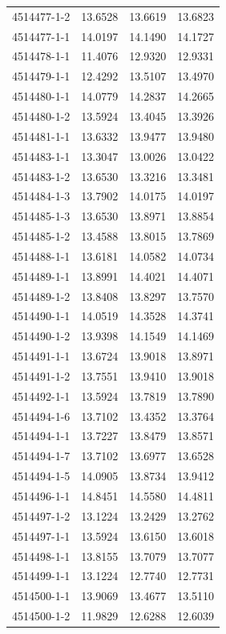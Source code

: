\begin{longtable}{lrrr}
4514477-1-2 & 13.6528 & 13.6619 & 13.6823 \\
4514477-1-1 & 14.0197 & 14.1490 & 14.1727 \\
4514478-1-1 & 11.4076 & 12.9320 & 12.9331 \\
4514479-1-1 & 12.4292 & 13.5107 & 13.4970 \\
4514480-1-1 & 14.0779 & 14.2837 & 14.2665 \\
4514480-1-2 & 13.5924 & 13.4045 & 13.3926 \\
4514481-1-1 & 13.6332 & 13.9477 & 13.9480 \\
4514483-1-1 & 13.3047 & 13.0026 & 13.0422 \\
4514483-1-2 & 13.6530 & 13.3216 & 13.3481 \\
4514484-1-3 & 13.7902 & 14.0175 & 14.0197 \\
4514485-1-3 & 13.6530 & 13.8971 & 13.8854 \\
4514485-1-2 & 13.4588 & 13.8015 & 13.7869 \\
4514488-1-1 & 13.6181 & 14.0582 & 14.0734 \\
4514489-1-1 & 13.8991 & 14.4021 & 14.4071 \\
4514489-1-2 & 13.8408 & 13.8297 & 13.7570 \\
4514490-1-1 & 14.0519 & 14.3528 & 14.3741 \\
4514490-1-2 & 13.9398 & 14.1549 & 14.1469 \\
4514491-1-1 & 13.6724 & 13.9018 & 13.8971 \\
4514491-1-2 & 13.7551 & 13.9410 & 13.9018 \\
4514492-1-1 & 13.5924 & 13.7819 & 13.7890 \\
4514494-1-6 & 13.7102 & 13.4352 & 13.3764 \\
4514494-1-1 & 13.7227 & 13.8479 & 13.8571 \\
4514494-1-7 & 13.7102 & 13.6977 & 13.6528 \\
4514494-1-5 & 14.0905 & 13.8734 & 13.9412 \\
4514496-1-1 & 14.8451 & 14.5580 & 14.4811 \\
4514497-1-2 & 13.1224 & 13.2429 & 13.2762 \\
4514497-1-1 & 13.5924 & 13.6150 & 13.6018 \\
4514498-1-1 & 13.8155 & 13.7079 & 13.7077 \\
4514499-1-1 & 13.1224 & 12.7740 & 12.7731 \\
4514500-1-1 & 13.9069 & 13.4677 & 13.5110 \\
4514500-1-2 & 11.9829 & 12.6288 & 12.6039 \\

\end{longtable}
